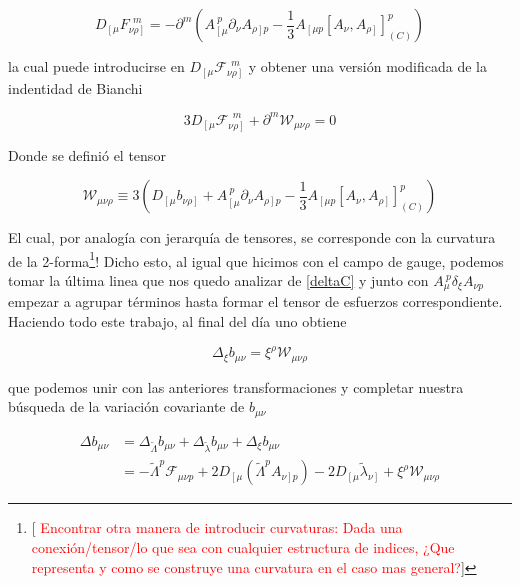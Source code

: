 \documentclass{article}
\numberwithin{equation}{section}
\begin{document}
\begin{equation}
D_{\left[ \mu \right.} F_{\left. \nu \rho \right]}^{\ \ m} = - \partial^m \left( A_{\left[ \mu\right.}^{\ p} \partial_{\nu} A_{\left. \rho \right] p } - \frac{1}{3} A_{\left[ \mu p \right.} \left[A_{\nu}, A_{\left.\rho\right]} \right]_{(C)}^p \right)
\end{equation}

la cual puede introducirse en $ D_{\left[ \mu \right.} \mathcal{F}_{\left. \nu \rho \right]}^{\ \ m} $ y obtener una versión modificada de la indentidad de Bianchi

\begin{equation}
3 D_{\left[ \mu \right.} \mathcal{F}_{\left. \nu \rho \right]}^{\ \ m} + \partial^m \mathcal{W}_{\mu \nu \rho} = 0
\end{equation}

Donde se definió el tensor

\begin{equation}\label{W}
\mathcal{W}_{\mu \nu \rho} \equiv 3 \left( D_{\left[ \mu \right.} b_{\left. \nu \rho \right]} + A_{\left[ \mu\right.}^{\ p} \partial_{\nu} A_{\left. \rho \right] p } - \frac{1}{3} A_{\left[ \mu p \right.} \left[A_{\nu}, A_{\left.\rho\right]} \right]_{(C)}^p\right)
\end{equation}

El cual, por analogía con jerarquía de tensores, se corresponde con la curvatura de la 2-forma\footnote{[\textcolor{red}{ Encontrar otra manera de introducir curvaturas: Dada una conexión/tensor/lo que sea con cualquier estructura de indices, ¿Que representa y como se construye una curvatura en el caso mas general?}]}! Dicho esto, al igual que hicimos con el campo de gauge, podemos tomar la última linea que nos quedo analizar de \ref{deltaC} y junto con $ A_{\mu}^{\ p} \delta_{\xi} A_{\nu p} $ empezar a agrupar términos hasta formar el tensor de esfuerzos correspondiente. Haciendo todo este trabajo, al final del día uno obtiene

\begin{equation}
\Delta_{\xi} b_{\mu \nu} = \xi^{\rho} \mathcal{W}_{\mu \nu \rho}
\end{equation}

que podemos unir con las anteriores transformaciones y completar nuestra búsqueda de la variación covariante de $ b_{\mu \nu} $

\begin{boxeq}
	\begin{equation}
	\begin{aligned}
	\Delta b_{\mu \nu} &= \Delta_{\widetilde{\Lambda}} b_{\mu \nu} + \Delta_{\widetilde{\lambda}} b_{\mu \nu} + \Delta_{\xi} b_{\mu \nu}\\
	&= -\widetilde{\Lambda}^p \mathcal{F}_{\mu \nu p} + 2 D_{\left[ \mu \right.} \left( \widetilde{\Lambda}^p A_{\left.\nu\right] p} \right) - 2 D_{\left[\mu \right.} \widetilde{\lambda}_{\left.\nu \right]} + \xi^{\rho} \mathcal{W}_{\mu \nu \rho}
	\end{aligned}
	\end{equation}
\end{boxeq}
\end{document}
